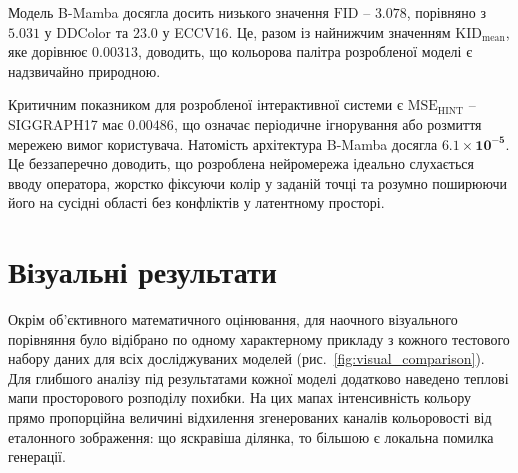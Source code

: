         Модель B-Mamba досягла досить низького значення $\mathrm{FID}$ -- $3.078$, порівняно з $5.031$ у DDColor та $23.0$ у ECCV16.
        Це, разом із найнижчим значенням $\mathrm{KID}_{\mathrm{mean}}$, яке дорівнює $0.00313$, доводить, що кольорова палітра розробленої моделі є надзвичайно природною.

        Критичним показником для розробленої інтерактивної системи є $\mathrm{MSE}_{\mathrm{HINT}}$ -- SIGGRAPH17 має $0.00486$, що означає періодичне ігнорування або розмиття мережею вимог користувача.
        Натомість архітектура B-Mamba досягла $\bm{6.1 \times 10^{-5}}$.
        Це беззаперечно доводить, що розроблена нейромережа ідеально слухається вводу оператора, жорстко фіксуючи колір у заданій точці та розумно поширюючи його на сусідні області без конфліктів у латентному просторі.

    \section{Візуальні результати}
        Окрім об'єктивного математичного оцінювання, для наочного візуального порівняння було відібрано по одному характерному прикладу з кожного тестового набору даних для всіх досліджуваних моделей (рис.~\ref{fig:visual_comparison}).
        Для глибшого аналізу під результатами кожної моделі додатково наведено теплові мапи просторового розподілу похибки.
        На цих мапах інтенсивність кольору прямо пропорційна величині відхилення згенерованих каналів кольоровості від еталонного зображення: що яскравіша ділянка, то більшою є локальна помилка генерації.
        

